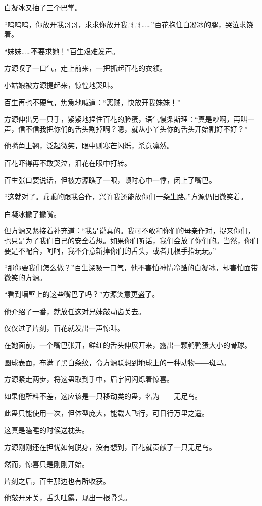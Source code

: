 \begin{this_body}
白凝冰又抽了三个巴掌。

“呜呜呜，你放开我哥哥，求求你放开我哥哥……”百花抱住白凝冰的腿，哭泣求饶着。

“妹妹……不要求她！”百生艰难发声。

方源叹了一口气，走上前来，一把抓起百花的衣领。

小姑娘被方源提起来，惊惶地哭叫。

百生再也不硬气，焦急地喊道：“恶贼，快放开我妹妹！”

方源伸出另一只手，紧紧地捏住百花的脸蛋，语气慢条斯理：“真是吵啊，再叫一声，信不信我把你们的舌头割掉啊？嗯，就从小丫头你的舌头开始割好不好？”

他嘴角上翘，泛起微笑，眼中则寒芒闪烁，杀意凛然。

百花吓得再不敢哭泣，泪花在眼中打转。

百生张口要说话，但被方源瞧了一眼，顿时心中一悸，闭上了嘴巴。

“这就对了。乖乖的跟我合作，兴许我还能放你们一条生路。”方源仍旧微笑着。

白凝冰撇了撇嘴。

但方源又紧接着补充道：“我是说真的。我可不敢和你们的母亲作对，捉来你们，也只是为了我们自己的安全着想。如果你们听话，我们会放了你们的。当然，你们要是不配合，呵呵，我不介意斩掉你们的舌头，或者几根手指玩玩。”

“那你要我们怎么做？”百生深吸一口气，他不害怕神情冷酷的白凝冰，却害怕面带微笑的方源。

“看到墙壁上的这些嘴巴了吗？”方源笑意更盛了。

他介绍了一番，就放任这对兄妹敲动齿关去。

仅仅过了片刻，百花就发出一声惊叫。

在她面前，一个嘴巴张开，鲜红的舌头伸展开来，露出一颗鹌鹑蛋大小的骨球。

圆球表面，布满了黑白条纹，令方源联想到地球上的一种动物――斑马。

方源紧走两步，将这蛊取到手中，眉宇间闪烁着惊喜。

如果他所料不差，这应该是一只移动类的蛊，名为――无足鸟。

此蛊只能使用一次，但体型庞大，能载人飞行，可日行万里之遥。

这真是瞌睡的时候送枕头。

方源刚刚还在担忧如何脱身，没有想到，百花就贡献了一只无足鸟。

然而，惊喜只是刚刚开始。

片刻之后，百生那边也有所收获。

他敲开牙关，舌头吐露，现出一根骨头。


\end{this_body}
